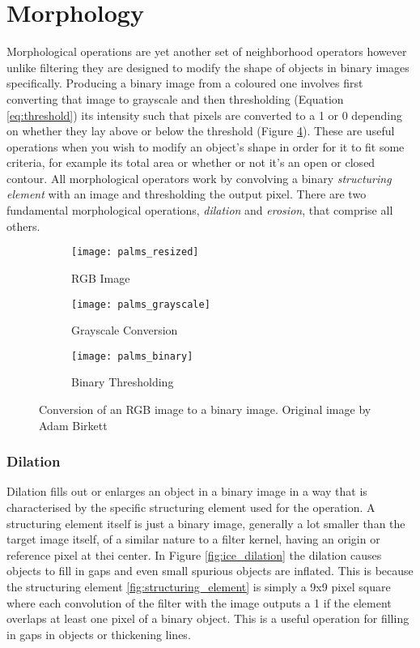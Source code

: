 \section{Morphology}
\label{section:morphology}
Morphological operations are yet another set of neighborhood operators however unlike filtering they are designed to modify the shape of objects in binary images specifically. Producing a binary image from a coloured one involves first converting that image to grayscale and then thresholding (Equation \ref{eq:threshold}) its intensity such that pixels are converted to a 1 or 0 depending on whether they lay above or below the threshold (Figure \ref{fig:thresholding}). These are useful operations when you wish to modify an object's shape in order for it to fit some criteria, for example its total area or whether or not it's an open or closed contour. All morphological operators work by convolving a binary \emph{structuring element} with an image and thresholding the output pixel. There are two fundamental morphological operations, \emph{dilation} and \emph{erosion}, that comprise all others. 

\begin{figure}[htbp]
    \centering
    \begin{subfigure}[b]{0.3\textwidth}
        \texttt{[image: palms\_resized]}
        \caption{RGB Image}
        \label{fig:emu_noise}
    \end{subfigure}
    \begin{subfigure}[b]{0.3\textwidth}
        \texttt{[image: palms\_grayscale]}
        \caption{Grayscale Conversion}
        \label{fig:emu_gauss}
    \end{subfigure}
    \begin{subfigure}[b]{0.3\textwidth}
        \texttt{[image: palms\_binary]}
        \caption{Binary Thresholding}
        \label{fig:emu_median}
    \end{subfigure}
    \captionsetup{format = hang}
    \caption{Conversion of an RGB image to a binary image. Original image by Adam Birkett}
    \label{fig:thresholding}
\end{figure}



\subsubsection{Dilation}

Dilation fills out or enlarges an object in a binary image in a way that is characterised by the specific structuring element used for the operation. A structuring element itself is just a binary image, generally a lot smaller than the target image itself, of a similar nature to a filter kernel, having an origin or reference pixel at thei center. In Figure \ref{fig:ice_dilation} the dilation causes objects to fill in gaps and even small spurious objects are inflated. This is because the structuring element \ref{fig:structuring_element} is simply a 9x9 pixel square where each convolution of the filter with the image outputs a 1 if the element overlaps at least one pixel of a binary object. This is a useful operation for filling in gaps in objects or thickening lines.


